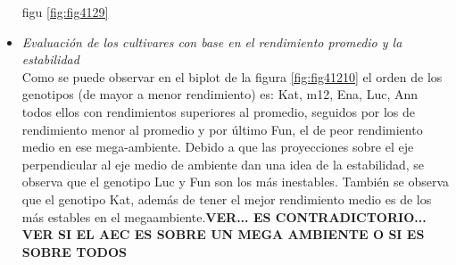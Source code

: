 \begin{itemize}[wide, nosep, labelindent = 0pt, topsep = 1ex, noitemsep,topsep=0pt]
figu \ref{fig:fig4129}

\item \emph{Evaluación de los cultivares con base en el rendimiento promedio y la estabilidad}\\

Como se puede observar en el biplot de la figura \ref{fig:fig41210} el orden de los genotipos (de mayor a menor rendimiento) es: Kat, m12, Ena, Luc, Ann todos ellos con rendimientos superiores al promedio, seguidos por los de rendimiento menor al promedio y por último Fun, el de peor rendimiento medio en ese mega-ambiente.
Debido a que las proyecciones sobre el eje perpendicular al eje medio de ambiente dan una idea de la estabilidad, se observa que el genotipo Luc y Fun son los más inestables. También se
observa que el genotipo Kat, además de tener el mejor rendimiento medio es de los más estables en el megaambiente.\textbf{VER... ES CONTRADICTORIO... VER SI EL AEC ES SOBRE UN MEGA AMBIENTE O SI ES SOBRE TODOS}


\end{itemize}
